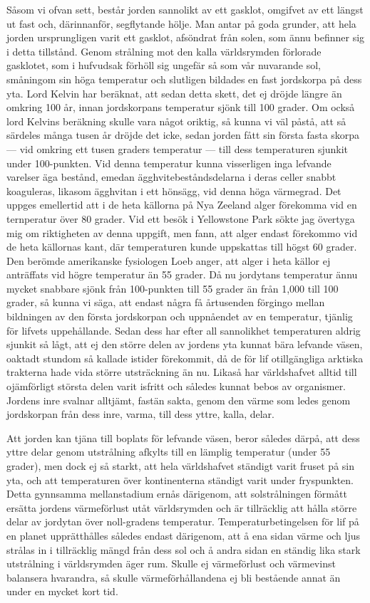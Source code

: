 \documentclass[a4paper, 12pt, oneside, swedish]{article}
\begin{document}
Såsom vi ofvan sett, består jorden sannolikt av ett gasklot, omgifvet av ett längst ut fast och, därinnanför, segflytande hölje. Man antar på goda grunder, att hela jorden ursprungligen varit ett gasklot, afsöndrat från solen, som ännu befinner sig i detta tillstånd. Genom strålning mot den kalla världsrymden förlorade gasklotet, som i hufvudsak förhöll sig ungefär så som vår nuvarande sol, småningom sin höga temperatur och slutligen bildades en fast jordskorpa på dess yta. Lord Kelvin har beräknat, att sedan detta skett, det ej dröjde längre än omkring 100 år, innan jordskorpans temperatur sjönk till 100 grader. Om också lord Kelvins beräkning skulle vara något oriktig, så kunna vi väl påstå, att så särdeles många tusen år dröjde det icke, sedan jorden fått sin första fasta skorpa --- vid omkring ett tusen graders temperatur --- till dess temperaturen sjunkit under 100-punkten. Vid denna temperatur kunna visserligen inga lefvande varelser äga bestånd, emedan ägghvitebeståndsdelarna i deras celler snabbt koaguleras, likasom ägghvitan i ett hönsägg, vid denna höga värmegrad. Det uppges emellertid att i de heta källorna på Nya Zeeland alger förekomma vid en ternperatur över 80 grader. Vid ett besök i Yellowstone Park sökte jag övertyga mig om riktigheten av denna uppgift, men fann, att alger endast förekommo vid de heta källornas kant, där temperaturen kunde uppskattas till högst 60 grader. Den berömde amerikanske fysiologen Loeb anger, att alger i heta källor ej anträffats vid högre temperatur än 55 grader. Då nu jordytans temperatur ännu mycket snabbare sjönk från 100-punkten till 55 grader än från 1,000 till 100 grader, så kunna vi säga, att endast några få årtusenden förgingo mellan bildningen av den första jordskorpan och uppnåendet av en temperatur, tjänlig för lifvets uppehållande. Sedan dess har efter all sannolikhet temperaturen aldrig sjunkit så lågt, att ej den större delen av jordens yta kunnat bära lefvande väsen, oaktadt stundom så kallade istider förekommit, då de för lif otillgängliga arktiska trakterna hade vida större utsträckning än nu. Likaså har världshafvet alltid till ojämförligt största delen varit isfritt och således kunnat bebos av organismer. Jordens inre svalnar alltjämt, fastän sakta, genom den värme som ledes genom jordskorpan från dess inre, varma, till dess yttre, kalla, delar.

Att jorden kan tjäna till boplats för lefvande väsen, beror således därpå, att dess yttre delar genom utstrålning afkylts till en lämplig temperatur (under 55 grader), men dock ej så starkt, att hela världshafvet ständigt varit fruset på sin yta, och att temperaturen över kontinenterna ständigt varit under fryspunkten. Detta gynnsamma mellanstadium ernås därigenom, att solstrålningen förmått ersätta jordens värmeförlust utåt världsrymden och är tillräcklig att hålla större delar av jordytan över noll-gradens temperatur. Temperaturbetingelsen för lif på en planet upprätthålles således endast därigenom, att å ena sidan värme och ljus strålas in i tillräcklig mängd från dess sol och å andra sidan en ständig lika stark utstrålning i världsrymden äger rum. Skulle ej värmeförlust och värmevinst balansera hvarandra, så skulle värmeförhållandena ej bli bestående annat än under en mycket kort tid.
\end{document}
